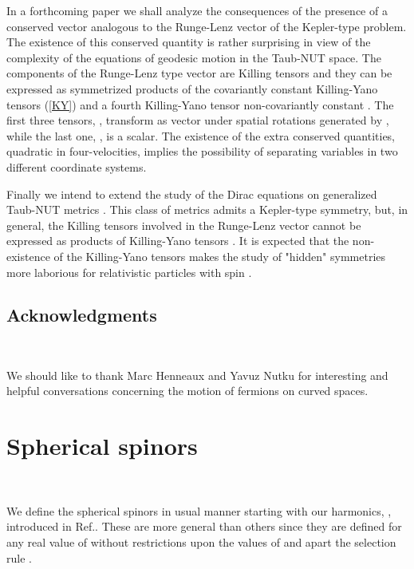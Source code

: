 \documentclass[a4paper,12pt]{article}
\begin{document}
In a forthcoming paper \cite{CV1} we shall analyze the consequences of the
presence of a conserved vector analogous to the Runge-Lenz vector of the
Kepler-type problem. The existence of this conserved quantity is rather
surprising in view of the complexity of the equations of geodesic motion
in the Taub-NUT space. The components of the Runge-Lenz type vector are
Killing tensors and they can be expressed as symmetrized products of the
covariantly constant Killing-Yano tensors \coordHE{} (\ref{KY}) and a fourth
Killing-Yano tensor \coordHE{} non-covariantly constant \cite{GR,G3}. The first 
three tensors, \coordHE{}, transform as vector under spatial rotations generated by 
\coordHE{}, while the last one, \coordHE{}, is a scalar. The existence of the
extra conserved quantities, quadratic in four-velocities, implies the
possibility of separating variables in two different coordinate systems.

Finally we intend to extend the study of the Dirac equations on
generalized Taub-NUT metrics \cite{IWK}. This class
of metrics admits a Kepler-type symmetry, but, in general, the Killing
tensors involved in the Runge-Lenz vector cannot be expressed as products
of Killing-Yano tensors \cite{MV}.
It is expected that the non-existence of the Killing-Yano
tensors makes the study of "hidden" symmetries more laborious for
relativistic particles with spin \coordHE{}.


\subsection*{Acknowledgments}
\

We should like to thank Marc Henneaux and Yavuz Nutku for interesting and
helpful conversations concerning the motion of fermions on curved spaces.



\appendix
\section{Spherical spinors}
\

We define the spherical spinors in  usual manner \cite{TH} starting with our 
\coordHE{} harmonics, \coordHE{}, introduced in Ref.\cite{CV}. 
These are more general than others \cite{HARM} since they are defined for  
any real value of \coordHE{} without restrictions upon the values of \coordHE{} and \coordHE{} 
apart the selection rule \coordHE{}. 
\end{document}
